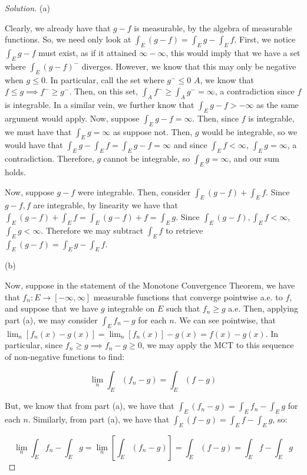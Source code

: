 \documentclass[10pt]{article}
\begin{document}
\begin{proof}[Solution]

(a) 

Clearly, we already have that $g-f$ is measurable, by the algebra of measurable functions. So, we need only look at $\int_E (g-f) = \int_E g - \int_E f$. First, we notice $\int_E g-f$ must exist, as if it attained $\infty - \infty$, this would imply that we have a set where $\int_E (g-f)^-$ diverges. However, we know that this may only be negative when $g \leq 0$. In particular, call the set where $g^- \leq 0$ $A$, we know that $f \leq g \implies f^- \geq g^-$. Then, on this set, $\int_A f^- \geq \int_A g^- = \infty$, a contradiction since $f$ is integrable. In a similar vein, we further know that $\int_E g-f > -\infty$ as the same argument would apply. Now, suppose $\int_E g-f = \infty$. Then, since $f$ is integrable, we must have that $\int_E g = \infty$ as suppose not. Then, $g$ would be integrable, so we would have that $\int_E g - \int_E f = \int_E g-f = \infty$ and since $\int_E f  < \infty$, $\int_E g = \infty$, a contradiction. Therefore, $g$ cannot be integrable, so $\int_E g = \infty$, and our sum holds.

Now, suppose $g-f$ were integrable. Then, consider $\int_E (g-f) + \int_E f$. Since $g-f, f$ are integrable, by linearity we have that $\int_E (g-f) + \int_E f = \int_E  (g-f) + f = \int_E g$. Since $\int_E (g-f), \int_E f < \infty$, $\int_E g < \infty$. Therefore we may subtract $\int_E f$ to retrieve $\int_E (g-f) = \int_E g - \int_E f$.

(b)

Now, suppose in the statement of the Monotone Convergence Theorem, we have that $f_n : E \to [-\infty,\infty]$ measurable functions that converge pointwise a.e. to $f$, and suppose that we have $g$ integrable on $E$ such that $f_n \geq g$ a.e. Then, applying part (a), we may consider $\int_E f_n - g$ for each $n$. We can see pointwise, that $\lim_n [f_n(x) - g(x)] = \lim_n[f_n(x)] - g(x) = f(x) - g(x)$. In particular, since $f_n \geq g \implies f_n-g \geq 0$, we may apply the MCT to this sequence of non-negative functions to find:

$$ \lim_n \int_E (f_n - g)  = \int_E (f - g)$$

But, we know that from part (a), we have that $ \int_E (f_n - g) = \int_E f_n - \int_E g$ for each $n$. Similarly, from part (a), we have that $\int_E (f-g) = \int_E f  - \int_E g$, so:

$$  \lim_n \int_E f_n - \int_E g = \lim_n [\int_E (f_n - g)]  = \int_E (f - g) = \int_E f - \int_E g$$


\end{proof}
\end{document}
